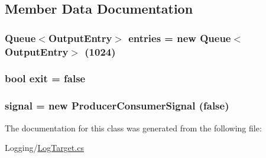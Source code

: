 \subsection{Member Data Documentation}
\hypertarget{classOTA_1_1Logging_1_1LogTarget_a7a7f792d063d5d1d30679d1d9581456b}{}
\subsubsection[{entries}]{\setlength{\rightskip}{0pt plus 5cm}Queue$<${\bf Output\+Entry}$>$ entries = new Queue$<${\bf Output\+Entry}$>$ (1024)\hspace{0.3cm}{\ttfamily [protected]}}\label{classOTA_1_1Logging_1_1LogTarget_a7a7f792d063d5d1d30679d1d9581456b}
\hypertarget{classOTA_1_1Logging_1_1LogTarget_add93a36b81b5f541d2f3237a7f363a7e}{}
\subsubsection[{exit}]{\setlength{\rightskip}{0pt plus 5cm}bool exit = false\hspace{0.3cm}{\ttfamily [protected]}}\label{classOTA_1_1Logging_1_1LogTarget_add93a36b81b5f541d2f3237a7f363a7e}
\hypertarget{classOTA_1_1Logging_1_1LogTarget_a72183e3b2c008e99f2b0ed66fe527ab5}{}
\subsubsection[{signal}]{ signal = new {\bf Producer\+Consumer\+Signal} (false)\hspace{0.3cm}{\ttfamily [protected]}}\label{classOTA_1_1Logging_1_1LogTarget_a72183e3b2c008e99f2b0ed66fe527ab5}


The documentation for this class was generated from the following file\+:\begin{DoxyCompactItemize}
\item 
Logging/\hyperlink{LogTarget_8cs}{Log\+Target.\+cs}\end{DoxyCompactItemize}
